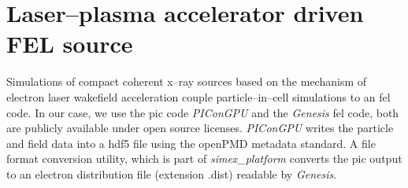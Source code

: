 \documentclass[10pt]{scrartcl}
\begin{document}
%
\section{Laser--plasma accelerator driven FEL source}\label{sec:lwfa_source}
%
Simulations of compact coherent x--ray sources based on the mechanism of
electron laser wakefield acceleration  couple particle--in--cell
simulations to an \gls{fel} code. In our case, we use the \gls{pic} code \textit{PIConGPU}
and the \textit{Genesis} \gls{fel} code, both are publicly available under open source licenses.
\textit{PIConGPU} writes the particle and field data
into a hdf5 file using the openPMD \cite{Huebl2017} metadata standard. A file format conversion utility, which is part of
\textit{simex\_platform} converts the \gls{pic} output to an electron distribution
file (extension .dist) readable by \textit{Genesis}.




\FloatBarrier

\printbibliography[notkeyword=submitted, notkeyword=inpreparation, notkeyword=report, notkeyword=zenodo, title={Journal articles}]
%
\printbibliography[keyword=submitted, title={Submitted articles}]
%
\printbibliography[keyword=inpreparation, title={Articles in preparation}]
%
\printbibliography[keyword=eucall, keyword=report, title={Project reports}]
%
\printbibliography[keyword=zenodo, title={Datasets}]
\end{document}
